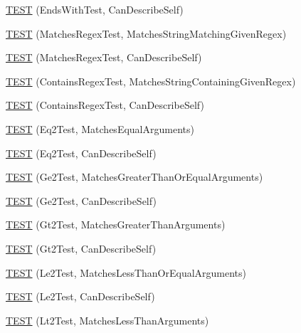 \begin{DoxyCompactItemize}
\item 
\hyperlink{namespacetesting_1_1gmock__matchers__test_a80da065ed9f5fb87add88ae2bc14056d}{T\+E\+ST} (Ends\+With\+Test, Can\+Describe\+Self)
\item 
\hyperlink{namespacetesting_1_1gmock__matchers__test_a5983e981b59498c6427ddb183c414bb7}{T\+E\+ST} (Matches\+Regex\+Test, Matches\+String\+Matching\+Given\+Regex)
\item 
\hyperlink{namespacetesting_1_1gmock__matchers__test_acb4e75ec699fe1bc178e7ec32fb479c8}{T\+E\+ST} (Matches\+Regex\+Test, Can\+Describe\+Self)
\item 
\hyperlink{namespacetesting_1_1gmock__matchers__test_a0a23f3ff8f97ccf74cd64673edc6694f}{T\+E\+ST} (Contains\+Regex\+Test, Matches\+String\+Containing\+Given\+Regex)
\item 
\hyperlink{namespacetesting_1_1gmock__matchers__test_ac3d469a146dec0c6ede2b46ff992c8d7}{T\+E\+ST} (Contains\+Regex\+Test, Can\+Describe\+Self)
\item 
\hyperlink{namespacetesting_1_1gmock__matchers__test_a768adf8450910e4c3ac0cb2caec8a4c2}{T\+E\+ST} (Eq2\+Test, Matches\+Equal\+Arguments)
\item 
\hyperlink{namespacetesting_1_1gmock__matchers__test_a45da3962b4ae052dd47e1ae1bfd8b762}{T\+E\+ST} (Eq2\+Test, Can\+Describe\+Self)
\item 
\hyperlink{namespacetesting_1_1gmock__matchers__test_a100bae52c11f2e44a141652002d3bee2}{T\+E\+ST} (Ge2\+Test, Matches\+Greater\+Than\+Or\+Equal\+Arguments)
\item 
\hyperlink{namespacetesting_1_1gmock__matchers__test_aaee5baf487e6234d1d8b6779b70a15c0}{T\+E\+ST} (Ge2\+Test, Can\+Describe\+Self)
\item 
\hyperlink{namespacetesting_1_1gmock__matchers__test_a4ef0cb0e88b7801075798649189d7b72}{T\+E\+ST} (Gt2\+Test, Matches\+Greater\+Than\+Arguments)
\item 
\hyperlink{namespacetesting_1_1gmock__matchers__test_ae7351eb01d03897324b2fe03045f2c10}{T\+E\+ST} (Gt2\+Test, Can\+Describe\+Self)
\item 
\hyperlink{namespacetesting_1_1gmock__matchers__test_add304ba60989990fc78a616c9592a948}{T\+E\+ST} (Le2\+Test, Matches\+Less\+Than\+Or\+Equal\+Arguments)
\item 
\hyperlink{namespacetesting_1_1gmock__matchers__test_a75d0bbfa66d404aa458f0739297c9edc}{T\+E\+ST} (Le2\+Test, Can\+Describe\+Self)
\item 
\hyperlink{namespacetesting_1_1gmock__matchers__test_ac7ecdd71d0cc49438f7ad1863fdfab05}{T\+E\+ST} (Lt2\+Test, Matches\+Less\+Than\+Arguments)

\end{DoxyCompactItemize}

